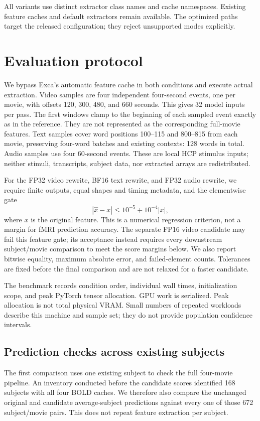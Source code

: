 \documentclass[10pt]{article}
\begin{document}
All variants use distinct extractor class names and cache namespaces. Existing
feature caches and default extractors remain available. The optimized paths
target the released configuration; they reject unsupported modes explicitly.

\section{Evaluation protocol}
We bypass Exca's automatic feature cache in both conditions and execute actual
extraction. Video samples are four independent four-second events, one per movie,
with offsets 120, 300, 480, and 660 seconds. This gives 32 model inputs per pass.
The first windows clamp to the beginning of each sampled event exactly as in
the reference. They are not represented as the corresponding full-movie features.
Text samples cover word positions 100--115 and 800--815 from each movie, preserving
four-word batches and existing contexts: 128 words in total. Audio samples use
four 60-second events. These are local HCP stimulus inputs; neither stimuli,
transcripts, subject data, nor extracted arrays are redistributed.

For the FP32 video rewrite, BF16 text rewrite, and FP32 audio rewrite, we require
finite outputs, equal shapes and timing metadata, and the elementwise gate
\begin{equation}
|\widehat{x}-x|\leq10^{-5}+10^{-4}|x|,
\end{equation}
where $x$ is the original feature. This is a numerical regression criterion,
not a margin for fMRI prediction accuracy. The separate FP16 video candidate
may fail this feature gate; its acceptance instead requires every downstream
subject/movie comparison to meet the score margins below. We also report bitwise equality,
maximum absolute error, and failed-element counts. Tolerances are fixed before
the final comparison and are not relaxed for a faster candidate.

The benchmark records condition order, individual wall times, initialization
scope, and peak PyTorch tensor allocation. GPU work is serialized. Peak allocation
is not total physical VRAM. Small numbers of repeated workloads describe this
machine and sample set; they do not provide population confidence intervals.

\subsection{Prediction checks across existing subjects}
The first comparison uses one existing subject to check the full four-movie
pipeline. An inventory conducted before the candidate scores identified 168
subjects with all four BOLD caches. We therefore also compare the unchanged
original and candidate average-subject predictions against every one of those
672 subject/movie pairs. This does not repeat feature extraction per subject.
\end{document}
